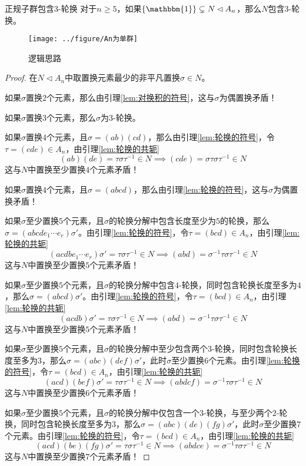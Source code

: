 \begin{lemma}{}{正规子群包含3-轮换}
	对于$n\ge 5$，如果$\{\mathbbm{1}\}\subsetneq N\lhd A_n$，那么$N$包含$3$-轮换。
\end{lemma}

\begin{figure}[H]
	\centering
	\texttt{[image: ../figure/An为单群]}
	\caption{逻辑思路}
\end{figure}

\begin{proof}
	在$N\lhd A_n$中取置换元素最少的非平凡置换$\sigma\in N$。
	
	如果$\sigma$置换$2$个元素，那么由引理\ref{lem:对换积的符号}，这与$\sigma$为偶置换矛盾！
	
	如果$\sigma$置换$3$个元素，那么$\sigma$为$3$-轮换。
	
	如果$\sigma$置换$4$个元素，且$\sigma=(ab)(cd)$，那么由引理\ref{lem:轮换的符号}，令$\tau=(cde)\in A_n$，由引理\ref{lem:轮换的共轭}
	$$
	(ab)(de)=\tau\sigma\tau^{-1}\in N\implies(cde)=\sigma\tau\sigma\tau^{-1}\in N
	$$
	这与$N$中置换至少置换$4$个元素矛盾！
	
	如果$\sigma$置换$4$个元素，且$\sigma=(abcd)$，那么由引理\ref{lem:轮换的符号}，这与$\sigma$为偶置换矛盾！
	
	如果$\sigma$至少置换$5$个元素，且$\sigma$的轮换分解中包含长度至少为$5$的轮换，那么$\sigma=(abcde_1\cdots e_r)\sigma'$。由引理\ref{lem:轮换的符号}，令$\tau=(bcd)\in A_n$，由引理\ref{lem:轮换的共轭}
	$$
	(acdbe_1\cdots e_r)\sigma'=\tau\sigma\tau^{-1}\in N\implies (abd)=\sigma^{-1}\tau\sigma\tau^{-1}\in N
	$$
	这与$N$中置换至少置换$5$个元素矛盾！
	
	如果$\sigma$至少置换$5$个元素，且$\sigma$的轮换分解中包含$4$-轮换，同时包含轮换长度至多为$4$，那么$\sigma=(abcd)\sigma'$。由引理\ref{lem:轮换的符号}，令$\tau=(bcd)\in A_n$，由引理\ref{lem:轮换的共轭}
	$$
	(acdb)\sigma'=\tau\sigma\tau^{-1}\in N\implies (abd)=\sigma^{-1}\tau\sigma\tau^{-1}\in N
	$$
	这与$N$中置换至少置换$5$个元素矛盾！
	
	如果$\sigma$至少置换$5$个元素，且$\sigma$的轮换分解中至少包含两个$3$-轮换，同时包含轮换长度至多为$3$，那么$\sigma=(abc)(def)\sigma'$，此时$\sigma$至少置换$6$个元素。由引理\ref{lem:轮换的符号}，令$\tau=(bcd)\in A_n$，由引理\ref{lem:轮换的共轭}
	$$
	(acd)(bef)\sigma'=\tau\sigma\tau^{-1}\in N\implies (abdcf)=\sigma^{-1}\tau\sigma\tau^{-1}\in N
	$$
	这与$N$中置换至少置换$6$个元素矛盾！
	
	如果$\sigma$至少置换$5$个元素，且$\sigma$的轮换分解中仅包含一个$3$-轮换，与至少两个$2$-轮换，同时包含轮换长度至多为$3$，那么$\sigma=(abc)(de)(fg)\sigma'$，此时$\sigma$至少置换$7$个元素。由引理\ref{lem:轮换的符号}，令$\tau=(bcd)\in A_n$，由引理\ref{lem:轮换的共轭}
	$$
	(acd)(be)(fg)\sigma'=\tau\sigma\tau^{-1}\in N\implies (abdce)=\sigma^{-1}\tau\sigma\tau^{-1}\in N
	$$
	这与$N$中置换至少置换$7$个元素矛盾！
	

\end{proof}
